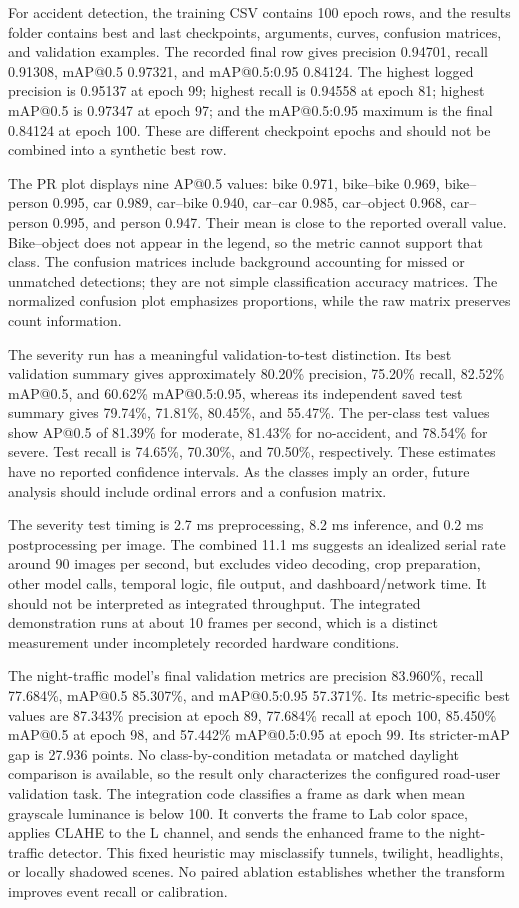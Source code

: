 \documentclass[12pt,a4paper]{article}
\begin{document}
For accident detection, the training CSV contains 100 epoch rows, and the results folder contains best and last checkpoints, arguments, curves, confusion matrices, and validation examples. The recorded final row gives precision 0.94701, recall 0.91308, mAP@0.5 0.97321, and mAP@0.5:0.95 0.84124. The highest logged precision is 0.95137 at epoch 99; highest recall is 0.94558 at epoch 81; highest mAP@0.5 is 0.97347 at epoch 97; and the mAP@0.5:0.95 maximum is the final 0.84124 at epoch 100. These are different checkpoint epochs and should not be combined into a synthetic best row.

The PR plot displays nine AP@0.5 values: bike 0.971, bike--bike 0.969, bike--person 0.995, car 0.989, car--bike 0.940, car--car 0.985, car--object 0.968, car--person 0.995, and person 0.947. Their mean is close to the reported overall value. Bike--object does not appear in the legend, so the metric cannot support that class. The confusion matrices include background accounting for missed or unmatched detections; they are not simple classification accuracy matrices. The normalized confusion plot emphasizes proportions, while the raw matrix preserves count information.

The severity run has a meaningful validation-to-test distinction. Its best validation summary gives approximately 80.20\% precision, 75.20\% recall, 82.52\% mAP@0.5, and 60.62\% mAP@0.5:0.95, whereas its independent saved test summary gives 79.74\%, 71.81\%, 80.45\%, and 55.47\%. The per-class test values show AP@0.5 of 81.39\% for moderate, 81.43\% for no-accident, and 78.54\% for severe. Test recall is 74.65\%, 70.30\%, and 70.50\%, respectively. These estimates have no reported confidence intervals. As the classes imply an order, future analysis should include ordinal errors and a confusion matrix.

The severity test timing is 2.7 ms preprocessing, 8.2 ms inference, and 0.2 ms postprocessing per image. The combined 11.1 ms suggests an idealized serial rate around 90 images per second, but excludes video decoding, crop preparation, other model calls, temporal logic, file output, and dashboard/network time. It should not be interpreted as integrated throughput. The integrated demonstration runs at about 10 frames per second, which is a distinct measurement under incompletely recorded hardware conditions.

The night-traffic model's final validation metrics are precision 83.960\%, recall 77.684\%, mAP@0.5 85.307\%, and mAP@0.5:0.95 57.371\%. Its metric-specific best values are 87.343\% precision at epoch 89, 77.684\% recall at epoch 100, 85.450\% mAP@0.5 at epoch 98, and 57.442\% mAP@0.5:0.95 at epoch 99. Its stricter-mAP gap is 27.936 points. No class-by-condition metadata or matched daylight comparison is available, so the result only characterizes the configured road-user validation task. The integration code classifies a frame as dark when mean grayscale luminance is below 100. It converts the frame to Lab color space, applies CLAHE to the L channel, and sends the enhanced frame to the night-traffic detector. This fixed heuristic may misclassify tunnels, twilight, headlights, or locally shadowed scenes. No paired ablation establishes whether the transform improves event recall or calibration.
\end{document}
